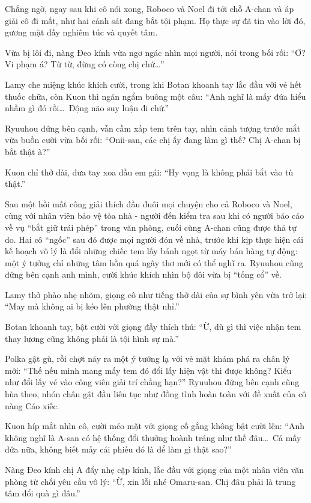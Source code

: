 \documentclass[../main.tex]{subfiles}
\begin{document}
Chẳng ngờ, ngay sau khi cô nói xong, Roboco và Noel đi tới chỗ A-chan và áp giải cô đi mất, như hai cảnh sát đang bắt tội phạm. Họ thực sự đã tin vào lời đó, gương mặt đầy nghiêm túc và quyết tâm.

Vừa bị lôi đi, nàng Đeo kính vừa ngơ ngác nhìn mọi người, nói trong bối rối: ``Ơ? Vi phạm á? Từ từ, đừng có còng chị chứ\dots''

Lamy che miệng khúc khích cười, trong khi Botan khoanh tay lắc đầu với vẻ hết thuốc chữa, còn Kuon thì ngán ngẩm buông một câu: ``Anh nghĩ là mấy đứa hiểu nhầm gì đó rồi\dots\ Động não suy luận đi chứ.''

Ryuuhou đứng bên cạnh, vẫn cầm xấp tem trên tay, nhìn cảnh tượng trước mắt vừa buồn cười vừa bối rối: ``Onii-san, các chị ấy đang làm gì thế? Chị A-chan bị bắt thật à?''

Kuon chỉ thở dài, đưa tay xoa đầu em gái: ``Hy vọng là không phải bắt vào tù thật.''

\ct

Sau một hồi mất công giải thích đầu đuôi mọi chuyện cho cả Roboco và Noel, cùng với nhân viên bảo vệ tòa nhà - người đến kiểm tra sau khi có người báo cáo về vụ ``bắt giữ trái phép'' trong văn phòng, cuối cùng A-chan cũng được thả tự do. Hai cô ``ngốc'' sau đó được mọi người đón về nhà, trước khi kịp thực hiện cái kế hoạch vô lý là đổi những chiếc tem lấy bánh ngọt từ máy bán hàng tự động: một ý tưởng chỉ những tâm hồn quá ngây thơ mới có thể nghĩ ra. Ryuuhou cũng đứng bên cạnh anh mình, cười khúc khích nhìn bộ đôi vừa bị ``tống cổ'' về.

Lamy thở phào nhẹ nhõm, giọng cô như tiếng thở dài của sự bình yên vừa trở lại: ``May mà không ai bị kéo lên phường thật nhỉ.''

Botan khoanh tay, bật cười với giọng đầy thích thú: ``Ừ, dù gì thì việc nhận tem thay lương cũng không phải là tội hình sự mà.''

Polka gật gù, rồi chợt nảy ra một ý tưởng lạ với vẻ mặt khám phá ra chân lý mới: ``Thế nếu mình mang mấy tem đó đổi lấy hiện vật thì được không? Kiểu như đổi lấy vé vào công viên giải trí chẳng hạn?'' Ryuuhou đứng bên cạnh cũng hùa theo, nhón chân gật đầu liên tục như đồng tình hoàn toàn với đề xuất của cô nàng Cáo xiếc.

Kuon híp mắt nhìn cô, cười méo mặt với giọng cố gắng không bật cười lên: ``Anh không nghĩ là A-san có hệ thống đổi thưởng hoành tráng như thế đâu\dots\ Cả mấy đứa nữa, không biết mấy cái phiếu đó là để làm gì thật sao?''

Nàng Đeo kính chị A đẩy nhẹ cặp kính, lắc đầu với giọng của một nhân viên văn phòng từ chối yêu cầu vô lý: ``Ừ, xin lỗi nhé Omaru-san. Chị đâu phải là trung tâm đổi quà gì đâu.''
\end{document}
